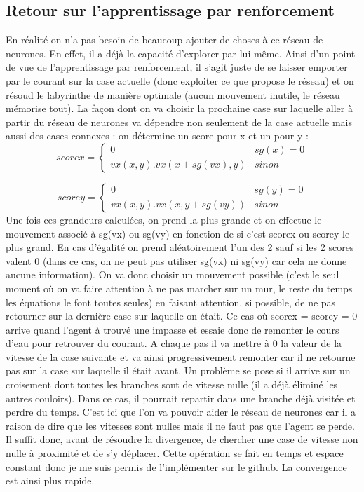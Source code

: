 \documentclass[12pt]{article}
\begin{document}
\subsection{Retour sur l'apprentissage par renforcement}
En réalité on n'a pas besoin de beaucoup ajouter de choses à ce réseau de neurones. En effet, il a déjà la capacité d'explorer par lui-même. Ainsi d'un point de vue de l'apprentissage par renforcement, il s'agit juste de se laisser emporter par le courant sur la case actuelle (donc exploiter ce que propose le réseau) et on résoud le labyrinthe de manière optimale (aucun mouvement inutile, le réseau mémorise tout). La façon dont on va choisir la prochaine case sur laquelle aller à partir du réseau de neurones va dépendre non seulement de la case actuelle mais aussi des cases connexes : on détermine un score pour x et un pour y :
\[scorex = 
\begin{cases}
	0 & sg(x) = 0 \\
	vx(x,y).vx(x+sg(vx),y) & sinon
\end{cases}
\]

\[scorey = 
\begin{cases}
	0 & sg(y) = 0 \\
	vx(x,y).vx(x,y+sg(vy)) & sinon
\end{cases}
\]
Une fois ces grandeurs calculées, on prend la plus grande et on effectue le mouvement associé à sg(vx) ou sg(vy) en fonction de si c'est scorex ou scorey le plus grand. En cas d'égalité on prend aléatoirement l'un des 2 sauf si les 2 scores valent 0 (dans ce cas, on ne peut pas utiliser sg(vx) ni sg(vy) car cela ne donne aucune information). On va donc choisir un mouvement possible (c'est le seul moment où on va faire attention à ne pas marcher sur un mur, le reste du temps les équations le font toutes seules) en faisant attention, si possible, de ne pas retourner sur la dernière case sur laquelle on était. Ce cas où scorex = scorey = 0 arrive quand l'agent à trouvé une impasse et essaie donc de remonter le cours d'eau pour retrouver du courant. A chaque pas il va mettre à 0 la valeur de la vitesse de la case suivante et va ainsi progressivement remonter car il ne retourne pas sur la case sur laquelle il était avant. Un problème se pose si il arrive sur un croisement dont toutes les branches sont de vitesse nulle (il a déjà éliminé les autres couloirs). Dans ce cas, il pourrait repartir dans une branche déjà visitée et perdre du temps. C'est ici que l'on va pouvoir aider le réseau de neurones car il a raison de dire que les vitesses sont nulles mais il ne faut pas que l'agent se perde. Il suffit donc, avant de résoudre la divergence, de chercher une case de vitesse non nulle à proximité et de s'y déplacer. Cette opération se fait en temps et espace constant donc je me suis permis de l'implémenter sur le github. La convergence est ainsi plus rapide.
\end{document}
